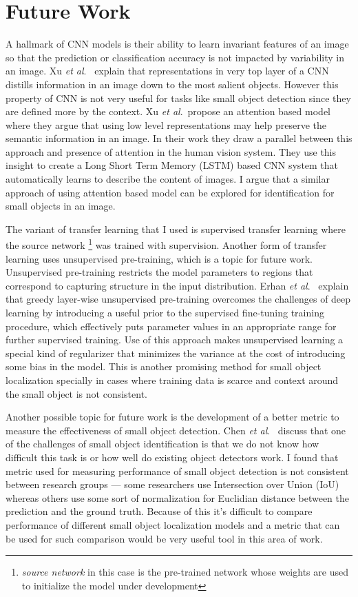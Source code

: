 \documentclass [11pt,letterpaper ,twoside ,openany ]{report}
\begin{document}
    \section{Future Work}
    A hallmark of CNN models is their ability to learn invariant features of an image so that the prediction or classification accuracy is not impacted by variability in an image. Xu \textit {et al}.\ \cite{xu2015show} explain that representations in very top layer of a CNN distills information in an image down to the most salient objects. However this property of CNN is not very useful for tasks like small object detection since they are defined more by the context. Xu \textit {et al}.\ propose an attention based model \cite{xu2015show} where they argue that using low level representations may help preserve the semantic information in an image. In their work they draw a parallel between this approach and presence of attention in the human vision system. They use this insight to create a Long Short Term Memory (LSTM) based CNN system that automatically learns to describe the content of images. I argue that a similar approach of using attention based model can be explored for identification for small objects in an image.

    The variant of transfer learning that I used is supervised transfer learning where the source network \footnote{\textit{source network} in this case is the pre-trained network whose weights are used to initialize the model under development} was trained with supervision. Another form of transfer learning uses unsupervised pre-training, which is a topic for future work. Unsupervised pre-training restricts the model parameters to regions that correspond to capturing structure in the input distribution. Erhan \textit {et al}.\ \cite{erhan2010does} explain that greedy layer-wise unsupervised pre-training overcomes the challenges of deep learning by introducing a useful prior to the supervised fine-tuning training procedure, which effectively puts parameter values in an appropriate range for further supervised training. Use of this approach makes unsupervised learning a special kind of regularizer that minimizes the variance at the cost of introducing some bias in the model. This is another promising method for small object localization specially in cases where training data is scarce and context around the small object is not consistent.

    Another possible topic for future work is the development of a better metric to measure the effectiveness of small object detection. Chen \textit {et al}.\ \cite{chen2016r} discuss that one of the challenges of small object identification is that we do not know how difficult this task is or how well do existing object detectors work. I found that metric used for measuring performance of small object detection is not consistent between research groups --- some researchers use Intersection over Union (IoU) whereas others use some sort of normalization for Euclidian distance between the prediction and the ground truth. Because of this it's difficult to compare performance of different small object localization models and a metric that can be used for such comparison would be very useful tool in this area of work.

    \printbibliography
\end{document}
